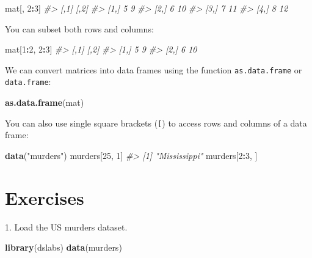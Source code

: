 \documentclass[
]{krantz}
\newenvironment{Shaded}{\begin{snugshade}}{\end{snugshade}}
\newcommand{\CommentTok}[1]{\textcolor[rgb]{0.37,0.37,0.37}{\textit{#1}}}
\newcommand{\DecValTok}[1]{\textcolor[rgb]{0.06,0.06,0.06}{#1}}
\newcommand{\KeywordTok}[1]{\textcolor[rgb]{0.27,0.27,0.27}{\textbf{#1}}}
\newcommand{\NormalTok}[1]{#1}
\newcommand{\OperatorTok}[1]{\textcolor[rgb]{0.43,0.43,0.43}{\textbf{#1}}}
\newcommand{\StringTok}[1]{\textcolor[rgb]{0.5,0.5,0.5}{#1}}
\begin{document}
\begin{Shaded}
\begin{Highlighting}[]
\NormalTok{mat[, }\DecValTok{2}\OperatorTok{:}\DecValTok{3}\NormalTok{]}
\CommentTok{#>      [,1] [,2]}
\CommentTok{#> [1,]    5    9}
\CommentTok{#> [2,]    6   10}
\CommentTok{#> [3,]    7   11}
\CommentTok{#> [4,]    8   12}
\end{Highlighting}
\end{Shaded}

You can subset both rows and columns:

\begin{Shaded}
\begin{Highlighting}[]
\NormalTok{mat[}\DecValTok{1}\OperatorTok{:}\DecValTok{2}\NormalTok{, }\DecValTok{2}\OperatorTok{:}\DecValTok{3}\NormalTok{]}
\CommentTok{#>      [,1] [,2]}
\CommentTok{#> [1,]    5    9}
\CommentTok{#> [2,]    6   10}
\end{Highlighting}
\end{Shaded}

We can convert matrices into data frames using the function \texttt{as.data.frame} or \texttt{data.frame}:

\begin{Shaded}
\begin{Highlighting}[]
\KeywordTok{as.data.frame}\NormalTok{(mat)}
\end{Highlighting}
\end{Shaded}

You can also use single square brackets (\texttt{{[}}) to access rows and columns of a data frame:

\begin{Shaded}
\begin{Highlighting}[]
\KeywordTok{data}\NormalTok{(}\StringTok{"murders"}\NormalTok{)}
\NormalTok{murders[}\DecValTok{25}\NormalTok{, }\DecValTok{1}\NormalTok{]}
\CommentTok{#> [1] "Mississippi"}
\NormalTok{murders[}\DecValTok{2}\OperatorTok{:}\DecValTok{3}\NormalTok{, ]}
\end{Highlighting}
\end{Shaded}

\hypertarget{exercises-1}{%
\section{Exercises}\label{exercises-1}}

1. Load the US murders dataset.

\begin{Shaded}
\begin{Highlighting}[]
\KeywordTok{library}\NormalTok{(dslabs)}
\KeywordTok{data}\NormalTok{(murders)}
\end{Highlighting}
\end{Shaded}
\end{document}
